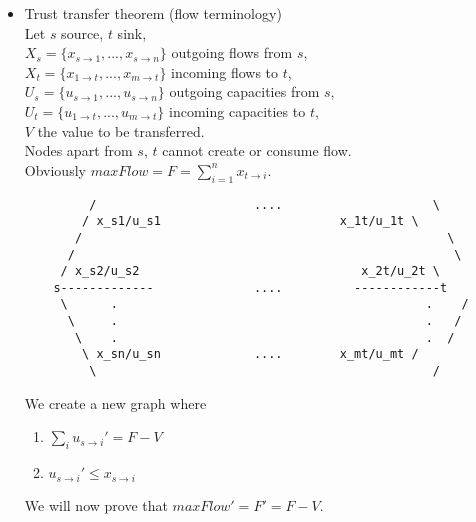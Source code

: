 \documentclass[11pt]{article}
\begin{document}
\begin{enumerate}
\begin{itemize}
    \item Trust transfer theorem (flow terminology) \\
    Let $s$ source, $t$ sink, \\
    $X_s = \{x_{s \rightarrow 1}, ..., x_{s \rightarrow n}\}$ outgoing flows from $s$, \\
    $X_t = \{x_{1 \rightarrow t}, ..., x_{m \rightarrow t}\}$ incoming flows to $t$, \\
    $U_s = \{u_{s \rightarrow 1}, ..., u_{s \rightarrow n}\}$ outgoing capacities from $s$, \\
    $U_t = \{u_{1 \rightarrow t}, ..., u_{m \rightarrow t}\}$ incoming capacities to $t$, \\
    $V$ the value to be transferred. \\
    Nodes apart from $s$, $t$ cannot create or consume flow. \\
    Obviously $maxFlow = F = \sum_{i=1}^{n}{x_{t \rightarrow i}}$.
    \begin{lstlisting}
         /                      ....                     \
        / x_s1/u_s1                         x_1t/u_1t \
       /                                                   \
      /                                                     \
     / x_s2/u_s2                               x_2t/u_2t \
    s-------------              ....          ------------t
     \      .                                           .    /
      \     .                                           .   /
       \    .                                           .  /
        \ x_sn/u_sn             ....        x_mt/u_mt /
         \                                               /
    \end{lstlisting}
    We create a new graph where
    \begin{enumerate}
      \item  $\sum_{i}{u_{s \rightarrow i}'} = F - V$
      \item $u_{s \rightarrow i}' \leq x_{s \rightarrow i}$
    \end{enumerate}
    
    We will now prove that $maxFlow' = F' = F - V$.
    

\end{itemize}
\end{enumerate}
\end{document}
